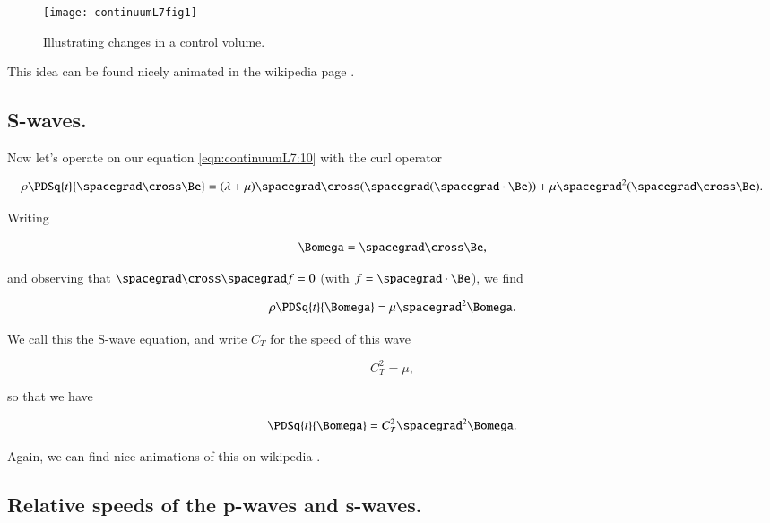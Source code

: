 \begin{figure}[htp]
   \centering
   \texttt{[image: continuumL7fig1]}
   \caption{Illustrating changes in a control volume.}\label{fig:continuumL7:continuumL7fig1}
\end{figure}

This idea can be found nicely animated in the wikipedia page \cite{wiki:pwave}.

\subsection{S-waves.}

Now let's operate on our equation \ref{eqn:continuumL7:10} with the curl operator

\begin{equation}\label{eqn:continuumL7:190}
\rho \PDSq{t}{\spacegrad \cross \Be} = (\lambda + \mu) \spacegrad \cross (\spacegrad (\spacegrad \cdot \Be)) + \mu \spacegrad^2 (\spacegrad \cross \Be).
\end{equation}

Writing 

\begin{equation}\label{eqn:continuumL7:210}
\Bomega = \spacegrad \cross \Be,
\end{equation}

and observing that $\spacegrad \cross \spacegrad f = 0$ (with $f = \spacegrad \cdot \Be$), we find

\begin{equation}\label{eqn:continuumL7:230}
\rho \PDSq{t}{\Bomega} = \mu \spacegrad^2 \Bomega.
\end{equation}

We call this the S-wave equation, and write $C_T$ for the speed of this wave

\begin{equation}\label{eqn:continuumL7:250}
C_T^2 = \mu,
\end{equation}

so that we have

\begin{equation}\label{eqn:continuumL7:270}
\PDSq{t}{\Bomega} = C_T^2 \spacegrad^2 \Bomega.
\end{equation}

Again, we can find nice animations of this on wikipedia \cite{wiki:swave}.

\subsection{Relative speeds of the p-waves and s-waves.}

